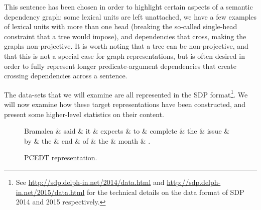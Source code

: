 This sentence has been chosen in order to highlight certain aspects of a semantic dependency graph: some lexical units are left unattached, we have a few examples of lexical units with more than one head (breaking the so-called single-head constraint that a tree would impose), and dependencies that cross, making the graphs non-projective. It is worth noting that a tree can be non-projective, and that this is not a special case for graph representations, but is often desired in order to fully represent longer predicate-argument dependencies that create crossing dependencies across a sentence.

The data-sets that we will examine are all represented in the SDP format\footnote{See \url{http://sdp.delph-in.net/2014/data.html} and \url{http://sdp.delph-in.net/2015/data.html} for the technical details on the data format of SDP 2014 and 2015 respectively.}. We will now examine how these target representations have been constructed, and present some higher-level statistics on their content.


\begin{figure}
    \centering
    \smaller[]
    \begin{dependency}[]
        \begin{deptext}[column sep=0.5em, row sep=.1ex]
            Bramalea \& said \& it \& expects \& to \& complete \& the \& issue \& by \& the \& end \& of \& the \& month \& . \\
        \end{deptext}
    \end{dependency}
    \caption{PCEDT representation.}
    \label{PCEDT}
\end{figure}

